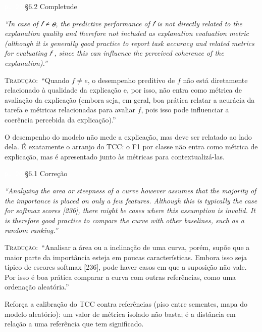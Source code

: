 \documentclass[11pt,a4paper]{article}
\newcommand{\pagechip}[1]{{\setlength{\fboxsep}{1.5pt}\colorbox{cAcc}{\textcolor{white}{\scriptsize\texttt{#1}}}}}
\newenvironment{origquote}{\par\itshape\small}{\par}
\newenvironment{tradquote}{\par\small\textsc{Tradução:}\ }{\par}
\newcommand{\explab}[1]{\par\smallskip{\small\color{cAcc}\textbf{\MakeUppercase{#1}}}\par}
\begin{document}
\begin{citacard}{\pagechip{p. 22} §6.2 Completude}
\begin{origquote}“In case of 𝑓 ≠ 𝑒, the predictive performance of 𝑓 is not directly related to the explanation quality and therefore not included as explanation evaluation metric (although it is generally good practice to report task accuracy and related metrics for evaluating 𝑓 , since this can influence the perceived coherence of the explanation).”\end{origquote}
\begin{tradquote}“Quando $f \neq e$, o desempenho preditivo de $f$ não está diretamente relacionado à qualidade da explicação e, por isso, não entra como métrica de avaliação da explicação (embora seja, em geral, boa prática relatar a acurácia da tarefa e métricas relacionadas para avaliar $f$, pois isso pode influenciar a coerência percebida da explicação).”\end{tradquote}
\explab{Explicação}
O desempenho do modelo não mede a explicação, mas deve ser relatado ao lado dela. É exatamente o arranjo do TCC: o F1 por classe não entra como métrica de explicação, mas é apresentado junto às métricas para contextualizá-las.
\end{citacard}

\begin{citacard}{\pagechip{p. 20} §6.1 Correção}
\begin{origquote}“Analyzing the area or steepness of a curve however assumes that the majority of the importance is placed on only a few features. Although this is typically the case for softmax scores [236], there might be cases where this assumption is invalid. It is therefore good practice to compare the curve with other baselines, such as a random ranking.”\end{origquote}
\begin{tradquote}“Analisar a área ou a inclinação de uma curva, porém, supõe que a maior parte da importância esteja em poucas características. Embora isso seja típico de escores softmax [236], pode haver casos em que a suposição não vale. Por isso é boa prática comparar a curva com outras referências, como uma ordenação aleatória.”\end{tradquote}
\explab{Explicação}
Reforça a calibração do TCC contra referências (piso entre sementes, mapa do modelo aleatório): um valor de métrica isolado não basta; é a distância em relação a uma referência que tem significado.
\end{citacard}
\end{document}
